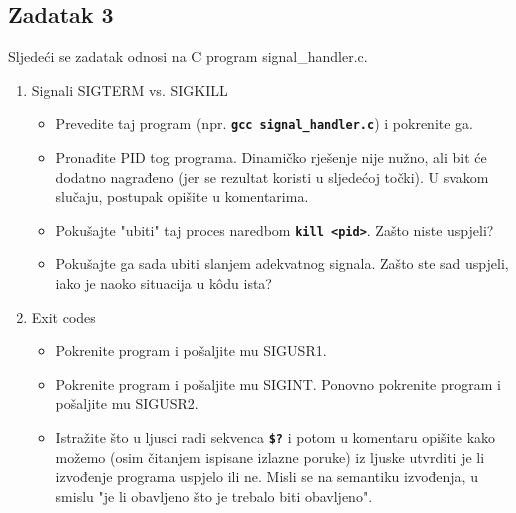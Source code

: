 \documentclass[12pt,a4paper]{article}
\newcommand{\shell}[1]{\texttt{\textbf{#1}}}
\begin{document}
	\subsection*{Zadatak 3}
	Sljedeći se zadatak odnosi na C program signal\_handler.c.
	\begin{enumerate}
		\item Signali SIGTERM vs. SIGKILL
		\begin{itemize}
		    \item Prevedite taj program (npr. \shell{gcc signal\_handler.c}) i pokrenite ga.
		    \item Pronađite PID tog programa. Dinamičko rješenje nije nužno, ali bit će dodatno nagrađeno (jer se rezultat koristi u sljedećoj točki). U svakom slučaju, postupak opišite u komentarima.
		    \item Pokušajte "ubiti" taj proces naredbom \shell{kill <pid>}. Zašto niste uspjeli?
		    \item Pokušajte ga sada ubiti slanjem adekvatnog signala. Zašto ste sad uspjeli, iako je naoko situacija u kôdu ista?
		  \end{itemize}
		\item Exit codes
		\begin{itemize}
			\item Pokrenite program i pošaljite mu SIGUSR1.
		    \item Pokrenite program i pošaljite mu SIGINT. Ponovno pokrenite program i pošaljite mu SIGUSR2. 
		    \item Istražite što u ljusci radi sekvenca \shell{\$?} i potom u komentaru opišite kako možemo (osim čitanjem ispisane izlazne poruke) iz ljuske utvrditi je li izvođenje programa uspjelo ili ne. Misli se na semantiku izvođenja, u smislu "je li obavljeno što je trebalo biti obavljeno".
		\end{itemize}
	\end{enumerate}
\end{document}
